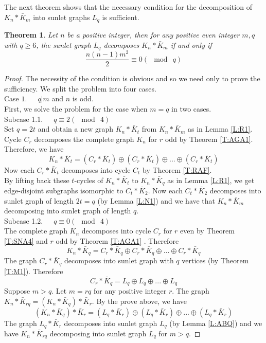 \documentclass[12pt]{report}
\newtheorem{thm}{Theorem}[section]
\begin{document}
The next theorem shows that the necessary condition for the decomposition of $K_n*\bar{K}_m$ into sunlet graphs $L_q$ is sufficient.
\begin{thm}\label{T:NM2}
Let $n$ be a positive integer, then for any positive even integer
$m,q$ with $q\geq 6$,
the sunlet graph $L_q$ decomposes $K_n*\bar{K}_m$ if and only if
$$\frac{n(n-1)m^2}{2}\equiv 0(\mod\
q)$$
\end{thm}
\begin{proof}
The necessity of the condition is obvious and so we need only to prove the sufficiency. We split the problem into four cases.\\
Case $1$.\ \ \ $q|m$ and $n$ is odd.\\
First, we solve the problem for the case when $m=q$ in two cases.\\
Subcase 1.1.\ \ \ $q\equiv 2(\mod\ 4)$\\
Set $q=2t$ and obtain a new graph $K_n*\bar{K}_t$ from
$K_n*\bar{K}_m$ as in Lemma \ref{L:R1}. Cycle $C_r$ decomposes the
complete graph $K_n$ for $r$ odd by Theorem \ref{T:AGA1}. Therefore,
we have
$$K_n*\bar{K}_t=(C_r*\bar{K}_t)\oplus (C_r*\bar{K}_t)\oplus...\oplus
(C_r*\bar{K}_t)$$
Now each $C_r*\bar{K}_t$ decomposes into cycle $C_t$ by Theorem \ref{T:RAF}.\\
By lifting back these $t$-cycles of $K_n*\bar{K}_t$ to
$K_n*\bar{K}_q$ as in Lemma \ref{L:R1}, we get edge-disjoint
subgraphs isomorphic to $C_t*\bar{K}_2$. Now each  $C_t*\bar{K}_2$
decomposes into sunlet graph of length $2t=q$ (by Lemma \ref{L:N1})
and we have that $K_n*\bar{K}_m$ decomposing into sunlet graph of
length $q$.
\\
Subcase 1.2.\ \ \ $q\equiv 0(\mod\ 4)$\\
The complete graph $K_n$ decomposes into cycle $C_r$ for $r$ even by
Theorem \ref{T:SNA4} and $r$ odd by Theorem \ref{T:AGA1} . Therefore
$$K_n*\bar{K}_q=C_r*\bar{K}_q\oplus C_r*\bar{K}_q\oplus...\oplus
C_r*\bar{K}_q$$ The graph $C_r*\bar{K}_q$ decomposes into sunlet
graph with $q$ vertices (by Theorem \ref{T:M1}). Therefore
$$C_r*\bar{K}_q=L_q\oplus L_q\oplus...\oplus L_q$$ Suppose $m>q$.
Let $m=rq$ for any positive integer $r$.   The graph
$K_n*\bar{K}_{rq}=(K_n*\bar{K}_q)*\bar{K}_r$. By the prove above, we
have $$(K_n*\bar{K}_q)*\bar{K}_r=(L_q*\bar{K}_r)\oplus
(L_q*\bar{K}_r)\oplus...\oplus(L_q*\bar{K}_r)$$ The graph
$L_q*\bar{K}_r$ decomposes into sunlet graph $L_q$ (by Lemma
\ref{L:ABQ}) and we have $K_n*\bar{K}_{rq}$ decomposing into sunlet
graph $L_q$ for $m>q$.

\end{proof}
\end{document}

